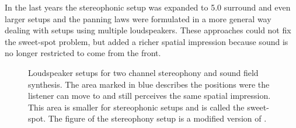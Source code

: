 In the last years the stereophonic setup was expanded to 5.0 surround
and even larger setups\cite[E.g.][]{Hamasaki2005} and the panning laws were
formulated in a more general way dealing with setups using multiple
loudspeakers.\cite{Pulkki1997}
These approaches could not fix the sweet-spot problem, but added a richer
spatial impression because sound is no longer restricted to come from the front.
%
\begin{figure}[t]
    \centering
    \small
    \caption{Loudspeaker setups for two channel stereophony
    and sound field synthesis. The area marked in blue describes the positions were the
    listener can move to and still perceives the same spatial impression. This
    area is smaller for stereophonic setups and is called the
    sweet-spot. The figure of the stereophony setup is a modified version of
    \cite[][Fig.\,1.1]{Ahrens2012}.
    }
    \label{fig:stereophony}
\end{figure}

